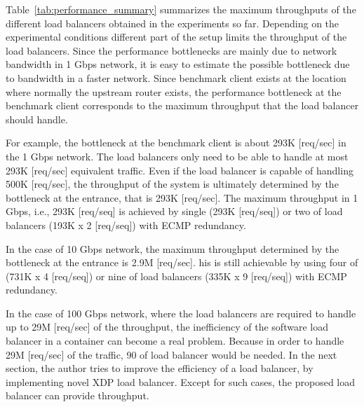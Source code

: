 Table~\ref{tab:performance_summary} summarizes the maximum throughputs of the different load balancers obtained in the experiments so far.
Depending on the experimental conditions different part of the  setup limits the throughput of the load balancers.
Since the performance bottlenecks are mainly due to network bandwidth in 1 Gbps network, it is easy to estimate the possible bottleneck due to bandwidth in a faster network.
Since benchmark client exists at the location where normally the upstream router exists, the performance bottleneck at the benchmark client corresponds to the maximum throughput that the load balancer should handle.

For example, the bottleneck at the benchmark client is about 293K [req/sec] in the 1 Gbps network. 
The load balancers only need to be able to handle at most 293K [req/sec] equivalent  traffic.
Even if the load balancer is capable of handling 500K [req/sec], the throughput of the system is ultimately determined by the bottleneck at the entrance, that is 293K [req/sec].
The maximum throughput in 1 Gbps, i.e., 293K [req/seq] is  achieved by single  (293K [req/seq]) or two of  load balancers (193K x 2 [req/seq]) with ECMP redundancy.

In the case of 10 Gbps network, the maximum throughput determined by the bottleneck at the entrance is 2.9M [req/sec].
his is still  achievable  by using four of  (731K x 4 [req/seq]) or nine of  load balancers (335K x 9 [req/seq]) with ECMP redundancy.

In the case of 100 Gbps network, where the load balancers are required to handle up to 29M [req/sec] of the throughput, the inefficiency of the software load balancer in a container can become a real problem.
Because in order to handle 29M [req/sec] of the traffic, 90 of  load balancer would be needed.
In the next section, the author tries to improve the efficiency of a load balancer, by implementing novel XDP load balancer.
Except for such cases, the proposed load balancer can provide  throughput.


